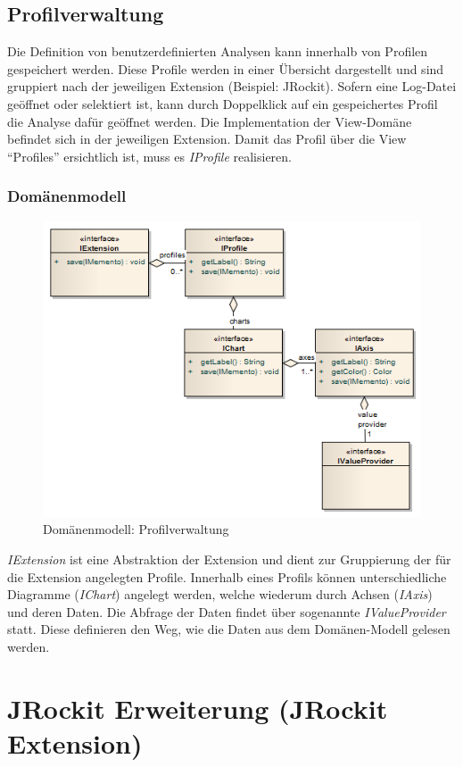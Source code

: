 \subsection{Profilverwaltung}
Die Definition von benutzerdefinierten Analysen kann innerhalb von Profilen gespeichert werden. Diese Profile werden in einer Übersicht dargestellt und sind gruppiert nach der jeweiligen Extension (Beispiel: JRockit). Sofern eine Log-Datei geöffnet oder selektiert ist, kann durch Doppelklick auf ein gespeichertes Profil die Analyse dafür geöffnet werden. Die Implementation der View-Domäne befindet sich in der jeweiligen Extension. Damit das Profil über die View ``Profiles'' ersichtlich ist, muss es \textit{IProfile} realisieren.
\subsubsection{Domänenmodell}
 \begin{figure}[H]
  	\centering
        	\caption{Domänenmodell: Profilverwaltung}
    	\includegraphics[width=13cm]{images/core_domain_profiles}
\end{figure}
\textit{IExtension} ist eine Abstraktion der Extension und dient zur Gruppierung der für die Extension angelegten Profile. Innerhalb eines Profils können unterschiedliche Diagramme (\textit{IChart}) angelegt werden, welche wiederum durch Achsen (\textit{IAxis}) und deren Daten. Die Abfrage der Daten findet über sogenannte \textit{IValueProvider} statt. Diese definieren den Weg, wie die Daten aus dem Domänen-Modell gelesen werden.

\section{JRockit Erweiterung (JRockit Extension)}
